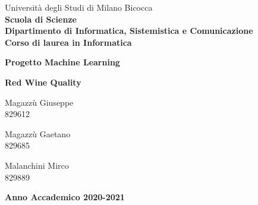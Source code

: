 \begin{titlepage}

  \begingroup
    \noindent
    \begin{minipage}[t]{0.18\textwidth}
    \end{minipage}%
    \hfill
    \begin{minipage}[t]{0.82\textwidth}\raggedright
      Università degli Studi di Milano Bicocca \\
      \small\textbf{Scuola di Scienze} \\
      \small\textbf{Dipartimento di Informatica, Sistemistica e Comunicazione}\\
      \small\textbf{Corso di laurea in Informatica} \\
    \end{minipage}%
  \par\endgroup

  \vspace{35mm}

  \begin{center}
    {\huge{\textbf{Progetto Machine Learning}}}
    
    \vspace{8mm}

    {\Huge{\textbf{Red Wine Quality}}}
  \end{center}

  \vspace{25mm}

  \begin{center}
    \large{Magazzù Giuseppe} \\ \large{829612}

    \vspace{4mm}
    \large{Magazzù Gaetano} \\ \large{829685}
    
    \vspace{4mm}
    \large{Malanchini Mirco} \\ \large{829889}
  \end{center}

  \vspace{30mm}
  \begin{center}
    {\large{\bf Anno Accademico 2020-2021}}
  \end{center}

  \restoregeometry

\end{titlepage}
